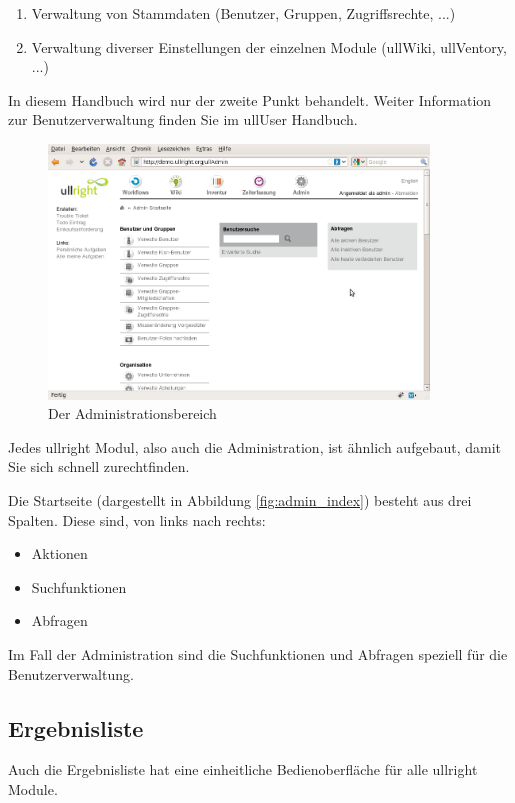 \documentclass[article, a4paper, oneside, 11pt]{memoir}
\begin{document}
\begin{enumerate}
\item Verwaltung von Stammdaten (Benutzer, Gruppen, Zugriffsrechte, ...)
\item Verwaltung diverser Einstellungen der einzelnen Module (ullWiki, ullVentory, ...)
\end{enumerate}
In diesem Handbuch wird nur der zweite Punkt behandelt. Weiter Information zur Benutzerverwaltung finden Sie im ullUser Handbuch.

\begin{figure}[htp]
\centering
\includegraphics[width=0.9\textwidth]{figures/ullrightgermanexport-img8.png}
\caption{Der Administrationsbereich}
\label{fig:admin_index}
\end{figure}

Jedes ullright Modul, also auch die Administration, ist ähnlich aufgebaut, damit Sie sich schnell zurechtfinden.

Die Startseite (dargestellt in Abbildung \vref{fig:admin_index}) besteht aus drei Spalten. Diese sind, von links nach rechts:

\begin{itemize}
\item Aktionen
\item Suchfunktionen
\item Abfragen
\end{itemize}
Im Fall der Administration sind die Suchfunktionen und Abfragen speziell für die Benutzerverwaltung.

\subsection{Ergebnisliste}
Auch die Ergebnisliste hat eine einheitliche Bedienoberfläche für alle ullright Module.
\end{document}
